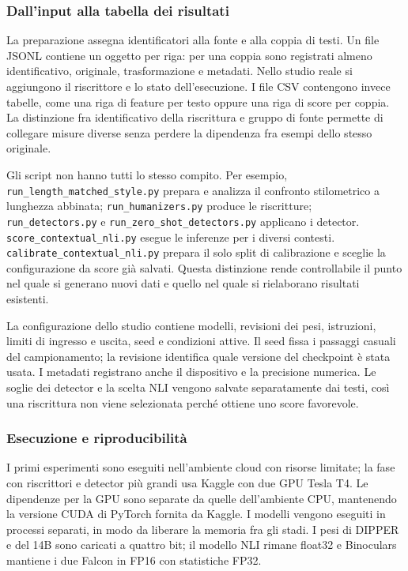 \subsubsection{Dall'input alla tabella dei risultati}\label{dallinput-alla-tabella-dei-risultati}

La preparazione assegna identificatori alla fonte e alla coppia di testi. Un file JSONL contiene un oggetto per riga: per una coppia sono registrati almeno identificativo, originale, trasformazione e metadati. Nello studio reale si aggiungono il riscrittore e lo stato dell'esecuzione. I file CSV contengono invece tabelle, come una riga di feature per testo oppure una riga di score per coppia. La distinzione fra identificativo della riscrittura e gruppo di fonte permette di collegare misure diverse senza perdere la dipendenza fra esempi dello stesso originale.

Gli script non hanno tutti lo stesso compito. Per esempio, \nolinkurl{run_length_matched_style.py} prepara e analizza il confronto stilometrico a lunghezza abbinata; \nolinkurl{run_humanizers.py} produce le riscritture; \nolinkurl{run_detectors.py} e \nolinkurl{run_zero_shot_detectors.py} applicano i detector. \nolinkurl{score_contextual_nli.py} esegue le inferenze per i diversi contesti. \nolinkurl{calibrate_contextual_nli.py} prepara il solo split di calibrazione e sceglie la configurazione da score già salvati. Questa distinzione rende controllabile il punto nel quale si generano nuovi dati e quello nel quale si rielaborano risultati esistenti.

La configurazione dello studio contiene modelli, revisioni dei pesi, istruzioni, limiti di ingresso e uscita, seed e condizioni attive. Il seed fissa i passaggi casuali del campionamento; la revisione identifica quale versione del checkpoint è stata usata. I metadati registrano anche il dispositivo e la precisione numerica. Le soglie dei detector e la scelta NLI vengono salvate separatamente dai testi, così una riscrittura non viene selezionata perché ottiene uno score favorevole.

\subsubsection{Esecuzione e riproducibilità}\label{esecuzione-e-riproducibilituxe0}

I primi esperimenti sono eseguiti nell'ambiente cloud con risorse limitate; la fase con riscrittori e detector più grandi usa Kaggle con due GPU Tesla T4. Le dipendenze per la GPU sono separate da quelle dell'ambiente CPU, mantenendo la versione CUDA di PyTorch fornita da Kaggle. I modelli vengono eseguiti in processi separati, in modo da liberare la memoria fra gli stadi. I pesi di DIPPER e del 14B sono caricati a quattro bit; il modello NLI rimane float32 e Binoculars mantiene i due Falcon in FP16 con statistiche FP32.

